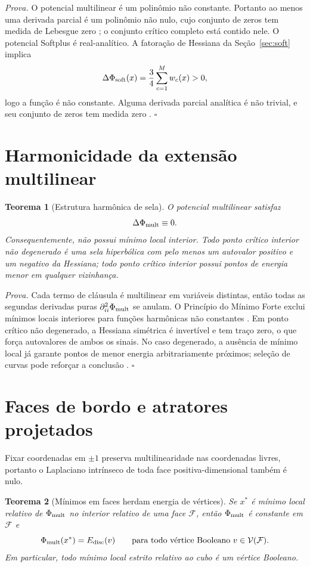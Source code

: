 \documentclass[11pt,a4paper]{article}
\newtheorem{theorem}{Teorema}[section]
\begin{document}
\noindent\textit{Prova.} O potencial multilinear é um polinômio não constante. Portanto ao menos uma derivada parcial é um polinômio não nulo, cujo conjunto de zeros tem medida de Lebesgue zero \cite{Okamoto,Caron}; o conjunto crítico completo está contido nele. O potencial Softplus é real-analítico. A fatoração de Hessiana da Seção~\ref{sec:soft} implica
\[
\Delta\Phi_{\rm soft}(x)=\frac34\sum_{c=1}^M w_c(x)>0,
\]
logo a função é não constante. Alguma derivada parcial analítica é não trivial, e seu conjunto de zeros tem medida zero \cite{Krantz}. \hfill$\square$

\section{Harmonicidade da extensão multilinear}
\begin{theorem}[Estrutura harmônica de sela]
O potencial multilinear satisfaz
\[
\Delta\Phi_{\rm mult}\equiv0.
\]
Consequentemente, não possui mínimo local interior. Todo ponto crítico interior não degenerado é uma sela hiperbólica com pelo menos um autovalor positivo e um negativo da Hessiana; todo ponto crítico interior possui pontos de energia menor em qualquer vizinhança.
\end{theorem}

\noindent\textit{Prova.} Cada termo de cláusula é multilinear em variáveis distintas, então todas as segundas derivadas puras $\partial_{ii}^2\Phi_{\rm mult}$ se anulam. O Princípio do Mínimo Forte exclui mínimos locais interiores para funções harmônicas não constantes \cite{Courant,Evans}. Em ponto crítico não degenerado, a Hessiana simétrica é invertível e tem traço zero, o que força autovalores de ambos os sinais. No caso degenerado, a ausência de mínimo local já garante pontos de menor energia arbitrariamente próximos; seleção de curvas pode reforçar a conclusão \cite{Milnor}. \hfill$\square$

\section{Faces de bordo e atratores projetados}
Fixar coordenadas em $\pm1$ preserva multilinearidade nas coordenadas livres, portanto o Laplaciano intrínseco de toda face positiva-dimensional também é nulo.

\begin{theorem}[Mínimos em faces herdam energia de vértices]
Se $x^*$ é mínimo local relativo de $\Phi_{\rm mult}$ no interior relativo de uma face $\mathcal F$, então $\Phi_{\rm mult}$ é constante em $\mathcal F$ e
\[
\Phi_{\rm mult}(x^*)=E_{\rm disc}(v)\qquad\text{para todo vértice Booleano }v\in\mathcal V(\mathcal F).
\]
Em particular, todo mínimo local estrito relativo ao cubo é um vértice Booleano.
\end{theorem}
\end{document}

